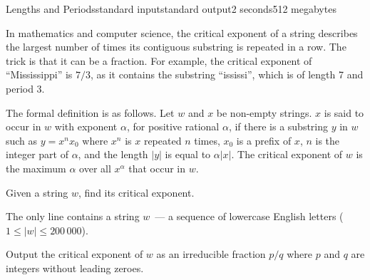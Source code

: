\begin{problem}{Lengths and Periods}{standard input}{standard output}{2 seconds}{512 megabytes}

In mathematics and computer science, the critical exponent of a string describes the largest number of times its contiguous substring is repeated in a row. The trick is that it can be a fraction. For example, the critical exponent of ``Mississippi'' is $7/3$, as it contains the substring ``ississi'', which is of length 7 and period 3.

The formal definition is as follows. Let $w$ and $x$ be non-empty strings. $x$ is said to occur in $w$ with exponent $\alpha$, for positive rational $\alpha$, if there is a substring $y$ in $w$ such as $y = x^nx_0$ where $x^n$ is $x$ repeated $n$ times, $x_0$ is a prefix of $x$, $n$ is the integer part of $\alpha$, and the length $|y|$ is equal to $\alpha |x|$. The critical exponent of $w$ is the maximum $\alpha$ over all $x^\alpha$ that occur in $w$.

Given a string $w$, find its critical exponent.

\InputFile
The only line contains a string $w$~--- a sequence of lowercase English letters ($1 \le |w| \le 200\,000$).

\OutputFile
Output the critical exponent of $w$ as an irreducible fraction $p/q$ where $p$ and $q$ are integers without leading zeroes.

\Examples

\begin{example}
%
%
\end{example}

\end{problem}

